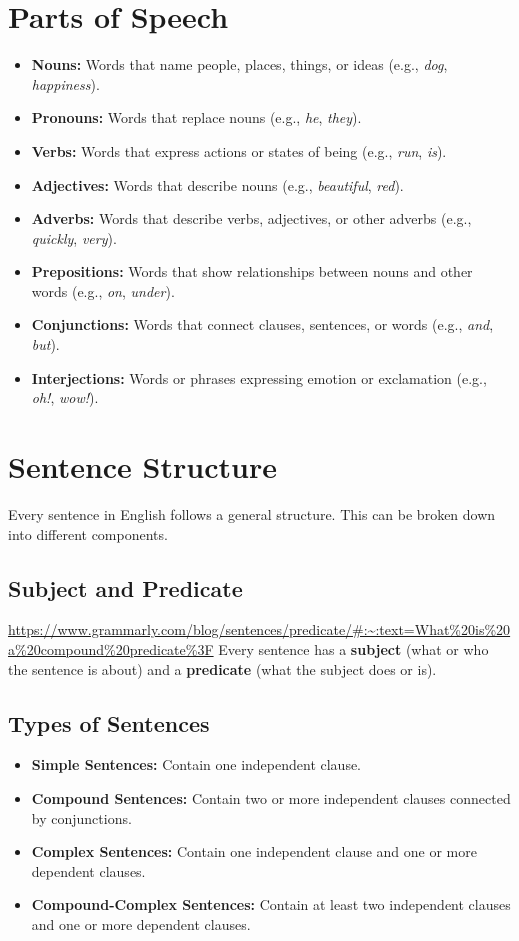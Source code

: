 \documentclass{book}
\begin{document}
\section{Parts of Speech}
\begin{itemize}
	\item \textbf{Nouns:} Words that name people, places, things, or ideas (e.g., \textit{dog}, \textit{happiness}).
	\item \textbf{Pronouns:} Words that replace nouns (e.g., \textit{he}, \textit{they}).
	\item \textbf{Verbs:} Words that express actions or states of being (e.g., \textit{run}, \textit{is}).
	\item \textbf{Adjectives:} Words that describe nouns (e.g., \textit{beautiful}, \textit{red}).
	\item \textbf{Adverbs:} Words that describe verbs, adjectives, or other adverbs (e.g., \textit{quickly}, \textit{very}).
	\item \textbf{Prepositions:} Words that show relationships between nouns and other words (e.g., \textit{on}, \textit{under}).
	\item \textbf{Conjunctions:} Words that connect clauses, sentences, or words (e.g., \textit{and}, \textit{but}).
	\item \textbf{Interjections:} Words or phrases expressing emotion or exclamation (e.g., \textit{oh!}, \textit{wow!}).
\end{itemize}

\section{Sentence Structure}
Every sentence in English follows a general structure. This can be broken down into different components.

\subsection{Subject and Predicate}
\url{https://www.grammarly.com/blog/sentences/predicate/#:~:text=What%20is%20a%20compound%20predicate%3F}
Every sentence has a \textbf{subject} (what or who the sentence is about) and a \textbf{predicate} (what the subject does or is).

\subsection{Types of Sentences}
\begin{itemize}
	\item \textbf{Simple Sentences:} Contain one independent clause.
	\item \textbf{Compound Sentences:} Contain two or more independent clauses connected by conjunctions.
	\item \textbf{Complex Sentences:} Contain one independent clause and one or more dependent clauses.
	\item \textbf{Compound-Complex Sentences:} Contain at least two independent clauses and one or more dependent clauses.
\end{itemize}
\end{document}
